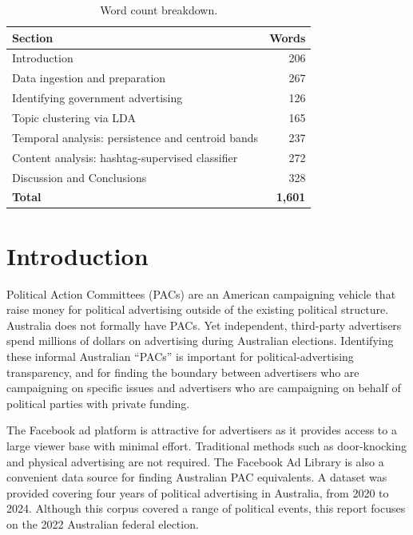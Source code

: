 \documentclass[11pt,a4paper]{article}
\begin{document}
\begin{table}[H]
  \centering
  \begin{tabular}{lr}
    \toprule
    \textbf{Section} & \textbf{Words} \\
    \midrule
    Introduction                                       & 206  \\
    Data ingestion and preparation                     & 267  \\
    Identifying government advertising                 & 126  \\
    Topic clustering via LDA                           & 165  \\
    Temporal analysis: persistence and centroid bands  & 237  \\
    Content analysis: hashtag-supervised classifier    & 272  \\
    Discussion and Conclusions                         & 328  \\
    \midrule
    \textbf{Total}                                     & \textbf{1{,}601} \\
    \bottomrule
  \end{tabular}
  \caption{Word count breakdown.}
  \label{tab:wordcount}
\end{table}

\newpage

\section{Introduction}
Political Action Committees (PACs) are an American campaigning vehicle that raise money for political advertising outside of the existing political structure. Australia does not formally have PACs. Yet independent, third-party advertisers spend millions of dollars on advertising during Australian elections. Identifying these informal Australian ``PACs'' is important for political-advertising transparency, and for finding the boundary between advertisers who are campaigning on specific issues and advertisers who are campaigning on behalf of political parties with private funding.

The Facebook ad platform is attractive for advertisers as it provides access to a large viewer base with minimal effort. Traditional methods such as door-knocking and physical advertising are not required. The Facebook Ad Library is also a convenient data source for finding Australian PAC equivalents. A dataset was provided covering four years of political advertising in Australia, from 2020 to 2024. Although this corpus covered a range of political events, this report focuses on the 2022 Australian federal election.
\end{document}
